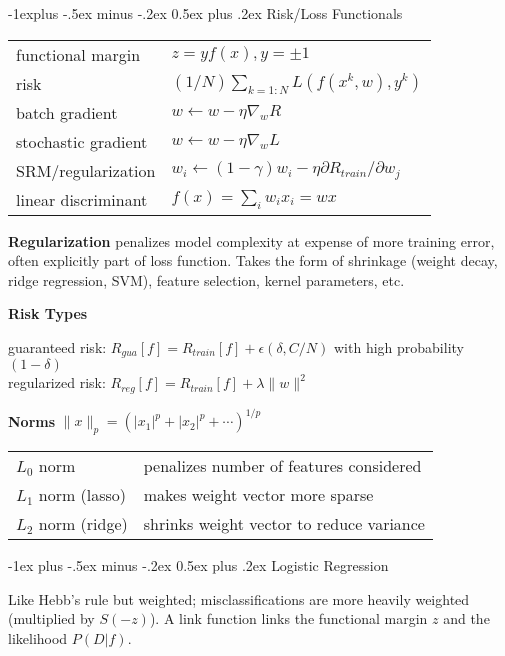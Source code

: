 \documentclass[9pt,landscape]{extarticle}
\makeatletter
\renewcommand{\section}{\@startsection{section}{1}{0mm}%
                                {-1ex plus -.5ex minus -.2ex}%
                                {0.5ex plus .2ex}%
                                {\normalfont\normalsize\bfseries}}
\renewcommand{\subsection}{\@startsection{subsection}{2}{0mm}%
                                {-1explus -.5ex minus -.2ex}%
                                {0.5ex plus .2ex}%
                                {\normalfont\small\bfseries}}
\makeatother
\begin{document}
\begin{multicols}{3}
\subsection{Risk/Loss Functionals}

\begin{tabular}{@{}ll@{}}
functional margin       & $z = y f(x), y=\pm 1$ \\
risk                    & $(1/N)\sum_{k=1:N} L(f(x^k, w), y^k)$ \\
batch gradient          & $w \leftarrow w - \eta\nabla_w R$ \\
stochastic gradient     & $w \leftarrow w - \eta\nabla_w L$ \\
SRM/regularization      & $w_i \leftarrow (1 - \gamma) w_i - \eta \partial R_{train} / \partial w_j$ \\
linear discriminant     & $f(x) = \sum_i w_i x_i = wx$ \\
\end{tabular}

\textbf{Regularization} penalizes model complexity at expense of more training error, often explicitly part of loss function. Takes the form of shrinkage (weight decay, ridge regression, SVM), feature selection, kernel parameters, etc.

\textbf{Risk Types}

guaranteed risk: $R_{gua}[f] = R_{train}[f] + \epsilon (\delta, C/N)$ with high probability $(1-\delta)$ \\
regularized risk: $R_{reg}[f] = R_{train}[f] + \lambda \lVert w \rVert^2$

\textbf{Norms} $\lVert x \rVert_p = (|x_1|^p + |x_2|^p + \cdots)^{1/p}$

\begin{tabular}{@{}ll@{}}
$L_0$ norm          & penalizes number of features considered \\
$L_1$ norm (lasso)  & makes weight vector more sparse \\
$L_2$ norm (ridge)  & shrinks weight vector to reduce variance \\
\end{tabular}


\section{Logistic Regression}

Like Hebb's rule but weighted; misclassifications are more heavily weighted (multiplied by $S(-z)$). A link function links the functional margin $z$ and the likelihood $P(D|f)$.


\end{multicols}
\end{document}

